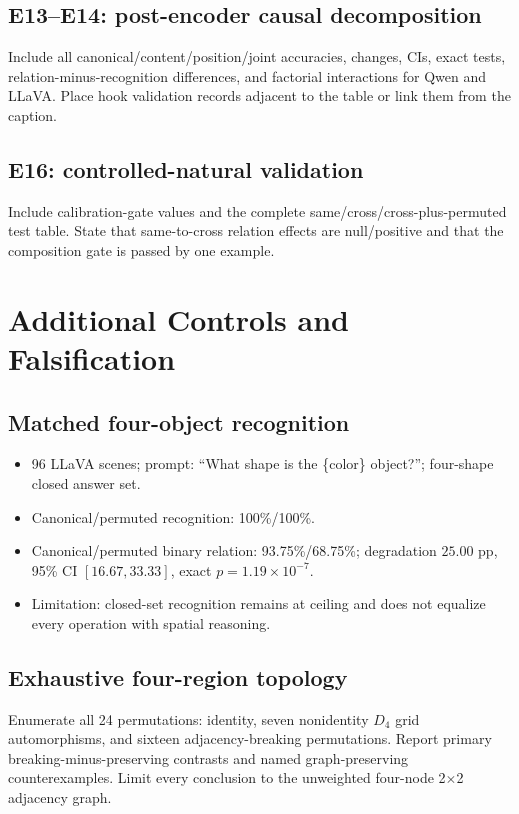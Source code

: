 \documentclass[10pt,twocolumn,letterpaper]{article}
\begin{document}
\subsection{E13--E14: post-encoder causal decomposition}
Include all canonical/content/position/joint accuracies, changes, CIs, exact tests, relation-minus-recognition differences, and factorial interactions for Qwen and LLaVA.
Place hook validation records adjacent to the table or link them from the caption.

\subsection{E16: controlled-natural validation}
Include calibration-gate values and the complete same/cross/cross-plus-permuted test table.
State that same-to-cross relation effects are null/positive and that the composition gate is passed by one example.

\section{Additional Controls and Falsification}

\subsection{Matched four-object recognition}

\begin{itemize}[leftmargin=*]
    \item 96 LLaVA scenes; prompt: ``What shape is the \{color\} object?''; four-shape closed answer set.
    \item Canonical/permuted recognition: 100\%/100\%.
    \item Canonical/permuted binary relation: 93.75\%/68.75\%; degradation $25.00$ pp, 95\% CI $[16.67,33.33]$, exact $p=1.19\times10^{-7}$.
    \item Limitation: closed-set recognition remains at ceiling and does not equalize every operation with spatial reasoning.
\end{itemize}

\subsection{Exhaustive four-region topology}

Enumerate all 24 permutations: identity, seven nonidentity $D_4$ grid automorphisms, and sixteen adjacency-breaking permutations.
Report primary breaking-minus-preserving contrasts and named graph-preserving counterexamples.
Limit every conclusion to the unweighted four-node 2$\times$2 adjacency graph.
\end{document}
